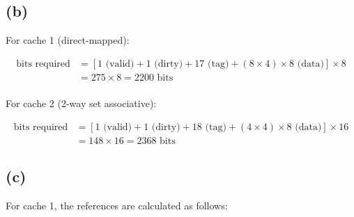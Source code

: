 \documentclass[12pt]{article}
\begin{document}
\subsection*{(b)}

For cache 1 (direct-mapped):

\begin{align*}
    \text{bits required} &= [1 \text{ (valid)} + 1 \text{ (dirty)} + 17 \text{ (tag)} + (8 \times 4) \times 8 \text{ (data)}] \times 8 \\
    &= 275 \times 8 = 2200 \text{ bits} \\
\end{align*}

For cache 2 (2-way set associative):

\begin{align*}
    \text{bits required} &= [1 \text{ (valid)} + 1 \text{ (dirty)} + 18 \text{ (tag)} + (4 \times 4) \times 8 \text{ (data)}] \times 16 \\
    &= 148 \times 16 = 2368 \text{ bits}
\end{align*}

\subsection*{(c)}

For cache 1, the references are calculated as follows:
\end{document}

